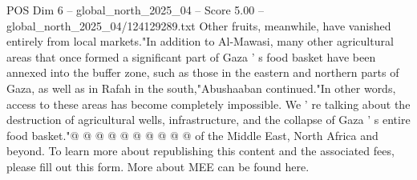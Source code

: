 \begin{textsample}{POS Dim 6 – global\_north\_2025\_04 – Score 5.00 – global\_north\_2025\_04/124129289.txt}
Other fruits, meanwhile, have vanished entirely from local markets."In addition to Al-Mawasi, many other agricultural areas that once formed a significant part of Gaza ' s food basket have been annexed into the buffer zone, such as those in the eastern and northern parts of Gaza, as well as in Rafah in the south,"Abushaaban continued."In other words, access to these areas has become completely impossible.
We ' re talking about the destruction of agricultural wells, infrastructure, and the collapse of Gaza ' s entire food basket."@ @ @ @ @ @ @ @ @ @ of the Middle East, North Africa and beyond.
To learn more about republishing this content and the associated fees, please fill out this form.
More about MEE can be found here.

\end{textsample}
